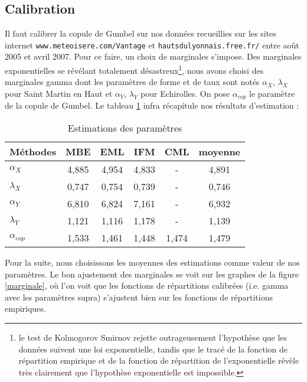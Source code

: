 \documentclass[11pt,a4paper]{article}
\newcommand{\code}{\texttt}
\begin{document}
\subsection{Calibration}
Il faut calibrer la copule de Gumbel sur nos donn\'ees recueillies sur les sites internet \code{www.meteoisere.com/Vantage}  et
\code{hautsdulyonnais.free.fr/} entre ao\^ut 2005 et avril 2007. Pour ce faire, un choix de marginales s'impose. Des marginales
exponentielles se r\'ev\'elant totalement d\'esastreux\footnote{le test de Kolmogorov Smirnov rejette outrageusement
l'hypoth\`ese que les donn\'ees suivent une loi exponentielle, tandis que le trac\'e de la fonction de r\'epartition empirique
et de la fonction de r\'epartition de l'exponentielle r\'ev\`ele tr\`es clairement que l'hypoth\`ese exponentielle est 
impossible.}, nous avons choisi des marginales gamma dont les param\`etres de forme 
et de taux sont not\'es $\alpha_X$, $\lambda_X$ pour Saint Martin en Haut
et $\alpha_Y$, $\lambda_Y$ pour Echirolles. On pose $\alpha_{cop}$ le param\`etre de la copule de Gumbel. 
Le tableau \ref{estim} infra r\'ecapitule nos r\'esultats d'estimation :
\begin{table}[!htb]
\center
\begin{tabular}{lccccc}
\hline
M\'ethodes & MBE & EML & IFM & CML & moyenne\\
\hline
$\alpha_X$ & 4,885 & 4,954 & 4,833 & - & 4,891\\
\hline
$\lambda_X$ & 0,747 & 0,754 & 0,739 & - & 0,746\\
\hline
$\alpha_Y$ & 6,810 & 6,824 & 7,161 & - & 6,932\\
\hline
$\lambda_Y$ & 1,121 & 1,116 & 1,178 & - & 1,139\\
\hline
$\alpha_{cop}$ & 1,533 & 1,461 & 1,448 & 1,474 & 1,479\\
\hline
\end {tabular}
\caption{Estimations des param\`etres}
\label{estim}
\end{table}

Pour la suite, nous choisissons les moyennes des estimations comme valeur de nos param\`etres.
Le bon ajustement des marginales se voit sur les graphes de la figure \ref{marginale}, o\`u l'on voit
que les fonctions de r\'epartitions calibr\'ees (i.e. gamma avec les param\`etres supra) s'ajustent
bien sur les fonctions de r\'epartitions empiriques.
\end{document}
